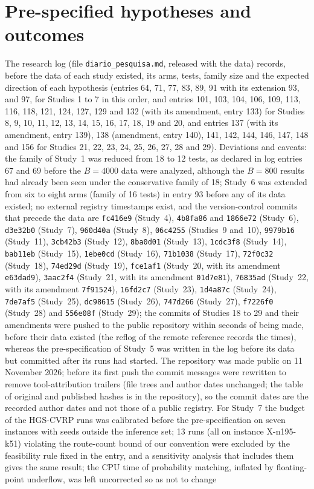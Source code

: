 \documentclass[11pt]{article}
\begin{document}
\section{Pre-specified hypotheses and outcomes}\label{sup:prereg}
The research log (file \texttt{diario\_pesquisa.md}, released with the data) records, before the data of each study existed, its arms, tests, family size and the expected direction of each hypothesis (entries 64, 71, 77, 83, 89, 91 with its extension 93, and 97, for Studies 1 to 7 in this order, and entries 101, 103, 104, 106, 109, 113, 116, 118, 121, 124, 127, 129 and 132 (with its amendment, entry 133) for Studies 8, 9, 10, 11, 12, 13, 14, 15, 16, 17, 18, 19 and 20, and entries 137 (with its amendment, entry 139), 138 (amendment, entry 140), 141, 142, 144, 146, 147, 148 and 156 for Studies 21, 22, 23, 24, 25, 26, 27, 28 and 29). Deviations and caveats: the family of Study~1 was reduced from 18 to 12 tests, as declared in log entries 67 and 69 before the $B=4000$ data were analyzed, although the $B=800$ results had already been seen under the conservative family of 18; Study~6 was extended from six to eight arms (family of 16 tests) in entry 93 before any of its data existed; no external registry timestamps exist, and the version-control commits that precede the data are \texttt{fc416e9} (Study~4), \texttt{4b8fa86} and \texttt{1866e72} (Study~6), \texttt{d3e32b0} (Study~7), \texttt{960d40a} (Study~8), \texttt{06c4255} (Studies~9 and~10), \texttt{9979b16} (Study~11), \texttt{3cb42b3} (Study~12), \texttt{8ba0d01} (Study~13), \texttt{1cdc3f8} (Study~14), \texttt{bab11eb} (Study~15), \texttt{1ebe0cd} (Study~16), \texttt{71b1038} (Study~17), \texttt{72f0c32} (Study~18), \texttt{74ed29d} (Study~19), \texttt{fce1af1} (Study~20, with its amendment \texttt{e63dad9}), \texttt{3aac2f4} (Study~21, with its amendment \texttt{01d7e81}), \texttt{76835ad} (Study~22, with its amendment \texttt{7f91524}), \texttt{16fd2c7} (Study~23), \texttt{1d4a87c} (Study~24), \texttt{7de7af5} (Study~25), \texttt{dc98615} (Study~26), \texttt{747d266} (Study~27), \texttt{f7226f0} (Study~28) and \texttt{556e08f} (Study~29); the commits of Studies 18 to 29 and their amendments were pushed to the public repository within seconds of being made, before their data existed (the reflog of the remote reference records the times), whereas the pre-specification of Study~5 was written in the log before its data but committed after its runs had started. The repository was made public on 11 November 2026; before its first push the commit messages were rewritten to remove tool-attribution trailers (file trees and author dates unchanged; the table of original and published hashes is in the repository), so the commit dates are the recorded author dates and not those of a public registry. For Study~7 the budget of the HGS-CVRP runs was calibrated before the pre-specification on seven instances with seeds outside the inference set; 13 runs (all on instance X-n195-k51) violating the route-count bound of our convention were excluded by the feasibility rule fixed in the entry, and a sensitivity analysis that includes them gives the same result; the CPU time of probability matching, inflated by floating-point underflow, was left uncorrected so as not to change 
\end{document}
